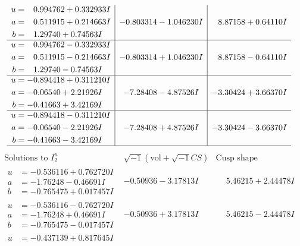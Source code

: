 \documentclass[1p]{elsarticle_modified}
\theoremstyle{definition}
\newcommand{\I}{\sqrt{-1}}
\begin{document}
$$\begin{array}{c|c|c}
\begin{aligned}
u &= \phantom{-}0.994762 + 0.332933 I \\
a &= \phantom{-}0.511915 + 0.214663 I \\
b &= \phantom{-}1.29740 + 0.74563 I\end{aligned}
 & -0.803314 - 1.046230 I & \phantom{-}8.87158 + 0.64110 I \\ \hline\begin{aligned}
u &= \phantom{-}0.994762 - 0.332933 I \\
a &= \phantom{-}0.511915 - 0.214663 I \\
b &= \phantom{-}1.29740 - 0.74563 I\end{aligned}
 & -0.803314 + 1.046230 I & \phantom{-}8.87158 - 0.64110 I \\ \hline\begin{aligned}
u &= -0.894418 + 0.311210 I \\
a &= -0.06540 + 2.21926 I \\
b &= -0.41663 + 3.42169 I\end{aligned}
 & -7.28408 - 4.87526 I & -3.30424 + 3.66370 I \\ \hline\begin{aligned}
u &= -0.894418 - 0.311210 I \\
a &= -0.06540 - 2.21926 I \\
b &= -0.41663 - 3.42169 I\end{aligned}
 & -7.28408 + 4.87526 I & -3.30424 - 3.66370 I\\
 \hline 
 \end{array}$$\newpage$$\begin{array}{c|c|c}  
\text{Solutions to }I^u_{2}& \I (\text{vol} + \sqrt{-1}CS) & \text{Cusp shape}\\
 \hline 
\begin{aligned}
u &= -0.536116 + 0.762720 I \\
a &= -1.76248 - 0.46691 I \\
b &= -0.765475 + 0.017457 I\end{aligned}
 & -0.50936 - 3.17813 I & \phantom{-}5.46215 + 2.44478 I \\ \hline\begin{aligned}
u &= -0.536116 - 0.762720 I \\
a &= -1.76248 + 0.46691 I \\
b &= -0.765475 - 0.017457 I\end{aligned}
 & -0.50936 + 3.17813 I & \phantom{-}5.46215 - 2.44478 I \\ \hline\begin{aligned}
u &= -0.437139 + 0.817645 I \\

\end{aligned}
\end{array}$$
\end{document}
